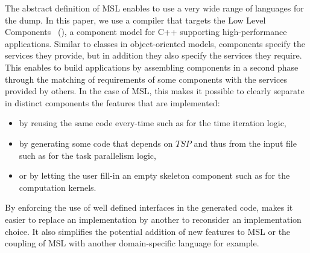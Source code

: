 

The abstract definition of MSL enables to use a very wide range of languages for the dump.
In this paper, we use a compiler that targets the Low Level Components~\cite{l2c} (\llc), a component model for C++ supporting high-performance applications.
Similar to classes in object-oriented models, components specify the services they provide, but in addition they also specify the services they require.
This enables to build applications by assembling components in a second phase through the matching of requirements of some components with the services provided by others.
In the case of MSL, this makes it possible to clearly separate in distinct components the features that are implemented:
\begin{itemize}
 \item by reusing the same code every-time such as for the time iteration logic,
 \item by generating some code that depends on $TSP$ and thus from the input file such as for the task parallelism logic,
 \item or by letting the user fill-in an empty skeleton component such as for the computation kernels.
\end{itemize}
By enforcing the use of well defined interfaces in the generated code, \llc makes it easier to replace an implementation by another to reconsider an implementation choice.
It also simplifies the potential addition of new features to MSL or the coupling of MSL with another domain-specific language for example.

